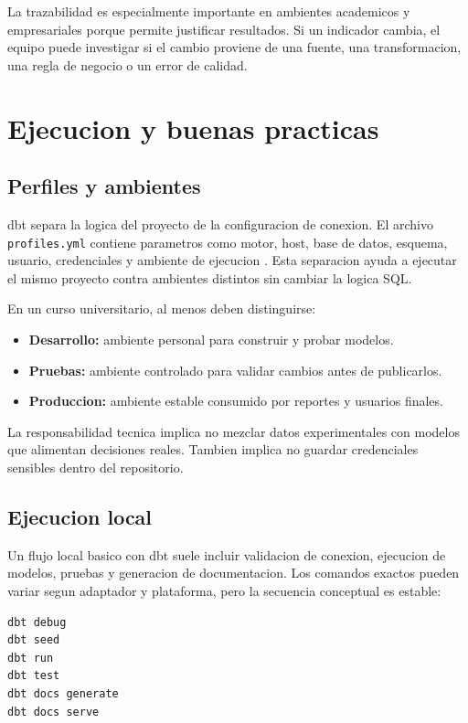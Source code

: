 \documentclass[12pt]{article}
\begin{document}
La trazabilidad es especialmente importante en ambientes academicos y empresariales porque permite justificar resultados. Si un indicador cambia, el equipo puede investigar si el cambio proviene de una fuente, una transformacion, una regla de negocio o un error de calidad.

\section{Ejecucion y buenas practicas}
\subsection{Perfiles y ambientes}
dbt separa la logica del proyecto de la configuracion de conexion. El archivo \texttt{profiles.yml} contiene parametros como motor, host, base de datos, esquema, usuario, credenciales y ambiente de ejecucion \cite{dbt_profiles}. Esta separacion ayuda a ejecutar el mismo proyecto contra ambientes distintos sin cambiar la logica SQL.

En un curso universitario, al menos deben distinguirse:

\begin{itemize}[leftmargin=*]
\item \textbf{Desarrollo:} ambiente personal para construir y probar modelos.
\item \textbf{Pruebas:} ambiente controlado para validar cambios antes de publicarlos.
\item \textbf{Produccion:} ambiente estable consumido por reportes y usuarios finales.
\end{itemize}

La responsabilidad tecnica implica no mezclar datos experimentales con modelos que alimentan decisiones reales. Tambien implica no guardar credenciales sensibles dentro del repositorio.

\subsection{Ejecucion local}
Un flujo local basico con dbt suele incluir validacion de conexion, ejecucion de modelos, pruebas y generacion de documentacion. Los comandos exactos pueden variar segun adaptador y plataforma, pero la secuencia conceptual es estable:

\begin{lstlisting}[style=sql, caption={Flujo local basico de trabajo con dbt}]
dbt debug
dbt seed
dbt run
dbt test
dbt docs generate
dbt docs serve
\end{lstlisting}
\end{document}
